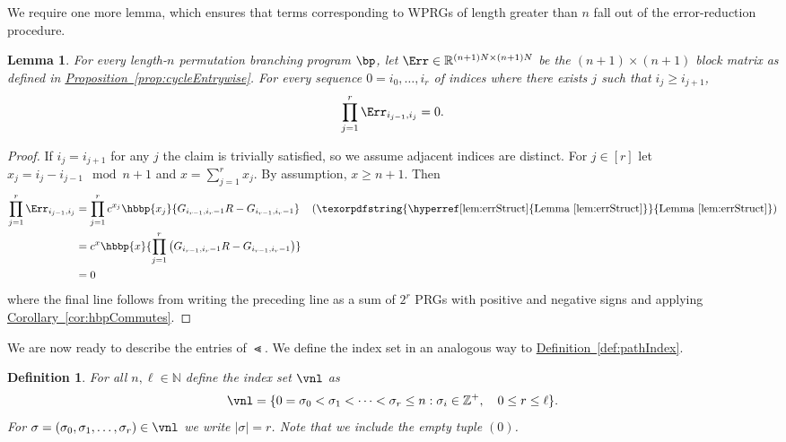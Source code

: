 \documentclass[11pt]{article}
\newcommand{\expref}[2]{\texorpdfstring{\hyperref[#2]{#1~\ref{#2}}}{#1~\ref{#2}}}
\newtheorem{lemma}[theorem]{Lemma}
\newtheorem{definition}[theorem]{Definition}
\newcommand{\R}{{\mathbb R}}
\newcommand{\Z}{{\mathbb Z}}
\newcommand{\N}{{\mathbb N}}
\begin{document}
We require one more lemma, which ensures that terms corresponding to WPRGs of length greater than $n$ fall out of the %
error-reduction %
procedure. 
\begin{lemma}\label{lem:noLongCycles}
  For every length-$n$ permutation branching program $\bp$, let $\Err\in \R^{(n+1)N\times (n+1)N}$ be the $(n+1)\times(n+1)$ block matrix as defined in \expref{Proposition}{prop:cycleEntrywise}. For every
%
sequence $0=i_0,\ldots,i_r$ of indices %
where there exists $j$ such that $i_j\geq i_{j+1}$,
\[\prod_{j=1}^r\Err_{i_{j-1},i_j} = 0.\]
\end{lemma}
\begin{proof}
If $i_j=i_{j+1}$ for any $j$ the claim is trivially satisfied, so we assume adjacent indices are distinct.
For $j\in[r]$ let $x_j=i_{j}-i_{j-1}\mod n+1$ and $x=\sum_{j=1}^rx_j$. By assumption, $x \geq n+1$. Then 
\begin{align*}
    \prod_{j=1}^r\Err_{i_{j-1},i_j} &= \prod_{j=1}^r c^{x_j}\hbbp{x_j}{G_{i_{r-1},i_r-1}R-G_{i_{r-1},i_r-1}}
    && \text{(\expref{Lemma}{lem:errStruct})}\\
    &= c^x\hbbp{x}{\prod_{j=1}^r \left(G_{i_{r-1},i_r-1}R-G_{i_{r-1},i_r-1}\right)}\\
    &= 0%
\end{align*}
%
where %
the final line follows from writing the %
preceding %
line as a sum of $2^r$ PRGs with positive and negative %
signs %
and applying \expref{Corollary}{cor:hbpCommutes}.
\end{proof}

We are now ready to describe the entries of $\Lt$. We define the index set in an analogous way to \expref{Definition}{def:pathIndex}.
\begin{definition}\label{def:cycleIndex}
For all $n,\ell \in \N$ define the index set $\vnl$ as
\[\vnl = \{0 =\sigma_0< \sigma_1<\dots<\sigma_r\leq n : \sigma_i\in \Z^+, \quad 0\leq r\leq \ell\}.\]
For $\sigma =(\sigma_0,\sigma_1,\dots,\sigma_r)\in \vnl$ we write $|\sigma|=r$. Note that we include the empty tuple $(0)$.
\end{definition}
\end{document}
